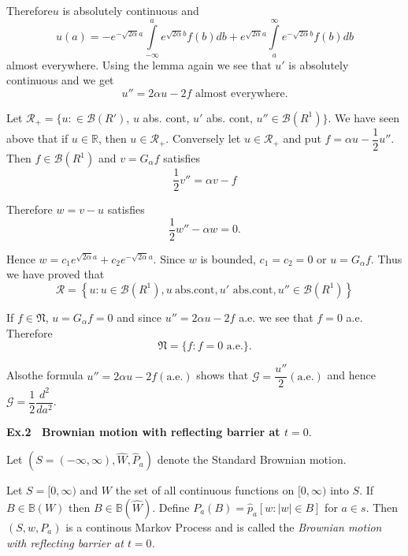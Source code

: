 Therefore\pageoriginale $u$ is absolutely continuous and  
$$
u (a )= - e ^{ - \sqrt{2 \alpha} a} \int\limits^a _{ - \infty} 
e^{\sqrt{2 \alpha} b} f (b) db + e ^{ \sqrt{ 2 \alpha}
  a}\int\limits^\infty_a 
e^{- \sqrt{2 \alpha} b} f (b) db  
$$
almost everywhere. Using the lemma again we see that $u'$ is
absolutely continuous and we get  
$$
u'' = 2 \alpha u - 2 f \text{\ almost everywhere}. 
$$

Let $\mathscr{R}_+ = \{ u : \in \mathscr{B}(R')$, $u$ abs. cont, $u'$
abs. cont, $u''\in \mathscr{B}(R^1)\}$. We have seen above that if $u \in
\mathbb{R}$, then $u \in \mathscr{R}_+$. Conversely let $u \in
\mathscr{R}_+$ and put $f = \alpha  u - \dfrac{1}{2} u''$. Then $f \in
\mathscr{B} (R^1)$ and $v = G_\alpha f$ satisfies  
$$
\frac{1}{2} v'' = \alpha v - f 
$$

Therefore $w = v - u$ satisfies 
$$
\frac{1}{2} w'' - \alpha w = 0.
$$

Hence $w = c_1 e^{\sqrt{2 \alpha} a} + c_2  e^{- \sqrt{2 \alpha} a}$. 
Since $w$ is bounded, $c_1 = c_2 = 0$ or $u = G_\alpha f$. Thus we
have proved that  
$$
\mathscr{R} = \left\{u : u \in \mathscr{B} (R^1), u~ \text{abs.cont}, u'
\text{\ abs.cont}, u'' \in \mathscr{B}(R^1) \right\} 
$$

If $f\in \mathfrak{N}$, $u = G_\alpha f = 0$ and since $u'' = 2 \alpha u
- 2 f$ a.e. we see that $f = 0$ a.e. Therefore  
$$
\mathfrak{N} = \{ f : f = 0 \text{ a.e.}\}.
$$

Also\pageoriginale the formula $u'' = 2 \alpha u - 2f (\text{a.e.})$
shows that  $\mathscr{G}=
\dfrac{u''}{2}(\text{a.e.})$ and hence $\mathscr{G} =
\dfrac{1}{2}\dfrac{d^2}{da^2}$.  

\medskip
\noindent
{\bf Ex.2~ Brownian motion with reflecting barrier at {\boldmath$t = 0$}}.  
\smallskip

Let $(S = (- \infty, \infty), \hat{W}, \hat{P}_a)$ denote the Standard
Brownian motion.  

Let $S = [ 0, \infty)$ and $W$ the set of all continuous functions on
  $[0, \infty)$ into $S$. If $B \in \mathbb{B}(W)$ then $B \in
    \mathbb{B} (\hat{W})$. Define $P_a (B) = \hat{p}_a [ w : | w| \in
      B ]$ for $a \in s $. Then $(S, w, P_a)$ is a continous Markov
    Process and is called the \textit{Brownian motion with reflecting
      barrier at $t = 0$.}  

